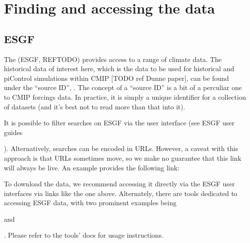\documentclass[letterpaper,10pt,english]{jupyterBook}
\begin{document}
\chapter{Finding and accessing the data}
\label{\detokenize{user-guide-historical:finding-and-accessing-the-data}}

\section{ESGF}
\label{\detokenize{user-guide-historical:esgf}}
\sphinxAtStartPar
The  (ESGF, REF\sphinxhyphen{}TODO) provides access to a
range of climate data.
The historical data of interest here,
which is the data to be used
for historical and piControl simulations within CMIP {[}TODO ref Dunne paper{]},
can be found under the “source ID”, .
The concept of a “source ID” is a bit of a perculiar one
to CMIP forcings data.
In practice, it is simply a unique identifier for a collection of datasets
(and it’s best not to read more than that into it).

\sphinxAtStartPar
It is possible to filter searches on ESGF
via the user interface (see ESGF user guides%
\begin{footnote}[1]\sphinxAtStartFootnote
{}
%
\end{footnote}).
Alternatively, searches can be encoded in URLs. However, a caveat with this
approach is that URLs sometimes move, so we make no guarantee that this link
will always be live. An example provides the following link:
\begin{quote}

\sphinxAtStartPar
{}
\end{quote}

\sphinxAtStartPar
To download the data, we recommend accessing it directly via the ESGF user interfaces
via links like the one above.
Alternately, there are tools dedicated to accessing ESGF data,
with two prominent examples being %
\begin{footnote}[2]\sphinxAtStartFootnote
{}
%
\end{footnote} and %
\begin{footnote}[3]\sphinxAtStartFootnote
{}
%
\end{footnote}.
Please refer to the tools’ docs for usage instructions.
\end{document}
